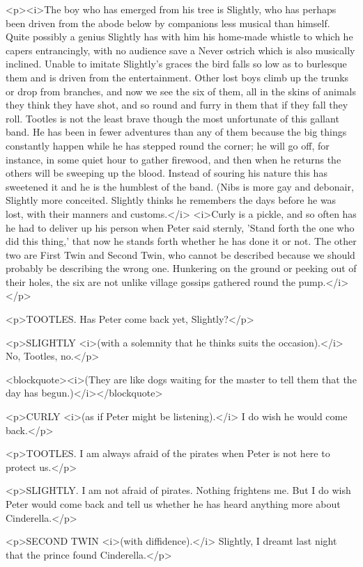 <p><i>The boy who has emerged from his tree is Slightly, who has perhaps been driven from the abode below by companions less musical than himself. Quite possibly a genius Slightly has with him his home-made whistle to which he capers entrancingly, with no audience save a Never ostrich which is also musically inclined. Unable to imitate Slightly's graces the bird falls so low as to burlesque them and is driven from the entertainment. Other lost boys climb up the trunks or drop from branches, and now we see the six of them, all in the skins of animals they think they have shot, and so round and furry in them that if they fall they roll. Tootles is not the least brave though the most unfortunate of this gallant band. He has been in fewer adventures than any of them because the big things constantly happen while he has stepped round the corner; he will go off, for instance, in some quiet hour to gather firewood, and then when he returns the others will be sweeping up the blood. Instead of souring his nature this has sweetened it and he is the humblest of the band. (Nibs is more gay and debonair, Slightly more conceited. Slightly thinks he remembers the days before he was lost, with their manners and customs.</i> <i>Curly is a pickle, and so often has he had to deliver up his person when Peter said sternly, 'Stand forth the one who did this thing,' that now he stands forth whether he has done it or not. The other two are First Twin and Second Twin, who cannot be described because we should probably be describing the wrong one. Hunkering on the ground or peeking out of their holes, the six are not unlike village gossips gathered round the pump.</i></p>

<p>TOOTLES. Has Peter come back yet, Slightly?</p>

<p>SLIGHTLY <i>(with a solemnity that he thinks suits the occasion).</i> No, Tootles, no.</p>

<blockquote><i>(They are like dogs waiting for the master to tell them that the day has begun.)</i></blockquote>

<p>CURLY <i>(as if Peter might be listening).</i> I do wish he would come back.</p>

<p>TOOTLES. I am always afraid of the pirates when Peter is not here to protect us.</p>

<p>SLIGHTLY. I am not afraid of pirates. Nothing frightens me. But I do wish Peter would come back and tell us whether he has heard anything more about Cinderella.</p>

<p>SECOND TWIN <i>(with diffidence).</i> Slightly, I dreamt last night that the prince found Cinderella.</p>


